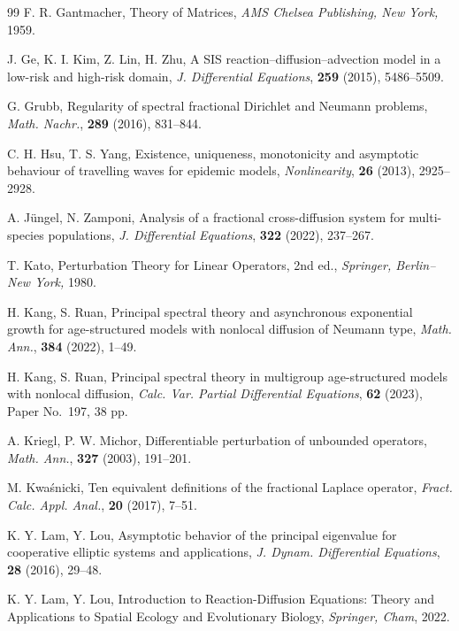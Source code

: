\documentclass[a4paper,11pt]{amsart}
\theoremstyle{definition}
\numberwithin{equation}{section}
\theoremstyle{definition}
\begin{document}
\begin{thebibliography}{99}
F. R. Gantmacher, 
Theory of Matrices, \textit{AMS Chelsea Publishing, New York,} 1959.

J. Ge, K. I. Kim, Z. Lin, H. Zhu, 
A SIS reaction--diffusion--advection model in a low-risk and high-risk domain, 
\textit{J. Differential Equations}, \textbf{259} (2015), 5486--5509.


G. Grubb, 
Regularity of spectral fractional Dirichlet and Neumann problems, 
\textit{Math. Nachr.}, \textbf{289} (2016), 831--844.

C. H. Hsu, T. S. Yang, 
Existence, uniqueness, monotonicity and asymptotic behaviour of travelling waves for epidemic models, 
\textit{Nonlinearity}, \textbf{26} (2013), 2925--2928.

A. Jüngel, N. Zamponi, 
Analysis of a fractional cross-diffusion system for multi-species populations, 
\textit{J. Differential Equations}, \textbf{322} (2022), 237--267.

T. Kato, 
Perturbation Theory for Linear Operators, 2nd ed., 
\textit{Springer, Berlin–New York,} 1980.

H. Kang, S. Ruan, 
Principal spectral theory and asynchronous exponential growth for age-structured models with nonlocal diffusion of Neumann type, 
\textit{Math. Ann.}, \textbf{384} (2022), 1--49.

H. Kang, S. Ruan, 
Principal spectral theory in multigroup age-structured models with nonlocal diffusion, 
\textit{Calc. Var. Partial Differential Equations}, \textbf{62} (2023), Paper No.~197, 38 pp.


A. Kriegl, P. W. Michor, 
Differentiable perturbation of unbounded operators, 
\textit{Math. Ann.}, \textbf{327} (2003), 191--201.


M. Kwaśnicki, 
Ten equivalent definitions of the fractional Laplace operator, 
\textit{Fract. Calc. Appl. Anal.}, \textbf{20} (2017), 7--51.

K. Y. Lam, Y. Lou, 
Asymptotic behavior of the principal eigenvalue for cooperative elliptic systems and applications, 
\textit{J. Dynam. Differential Equations}, \textbf{28} (2016), 29--48.

K. Y. Lam, Y. Lou, 
Introduction to Reaction-Diffusion Equations: Theory and Applications to Spatial Ecology and Evolutionary Biology, 
\textit{Springer, Cham}, 2022.


\end{thebibliography}
\end{document}
